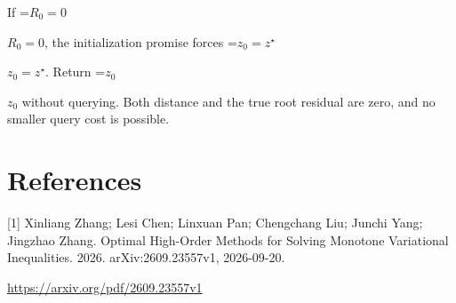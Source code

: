 \documentclass[10pt,a4paper]{article}
\newcommand{\AtlasMath}[1]{\par\begingroup\centering\setbox0=\hbox{$\displaystyle #1$}\ifdim\wd0>1.4\linewidth\typeout{ATLAS WIDE FORMULA: \the\wd0}\fi\ifdim\wd0>\linewidth\resizebox{\linewidth}{!}{\box0}\else\box0\fi\par\endgroup}
\newcommand{\AtlasInlineMath}[1]{\begingroup\setbox0=\hbox{$#1$}\ifdim\wd0>.4\linewidth\endgroup\AtlasMath{#1}\else\endgroup$#1$\fi}
\begin{document}
If \AtlasInlineMath{R_0=0}, the initialization promise forces \AtlasInlineMath{z_0=z^\star}. Return \AtlasInlineMath{z_0} without querying. Both distance and the true root residual are zero, and no smaller query cost is possible.

\section{References}
[1] Xinliang Zhang; Lesi Chen; Linxuan Pan; Chengchang Liu; Junchi Yang; Jingzhao Zhang. Optimal High-Order Methods for Solving Monotone Variational Inequalities. 2026. arXiv:2609.23557v1, 2026-09-20.

\url{https://arxiv.org/pdf/2609.23557v1}
\end{document}
